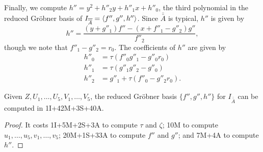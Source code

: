 \begin{comment}
\begin{align*}
  G_3 &= u_5 \\
  f''_2 &= u_5(u_5 - c_8) + u_4 - v_5 \\
  G_2 &= v_4 + v_5(u_5 - c_8) + \tau(u_5(u_5(u_3 - c_6) + v_5(u_4 - c_7) + c_5 - v_3) + v_5(u_3 - v_4) - u_2) \\
  e_3 &= f''_2v_5 - G_2u_5 \\
  f''_1 &= u_5(u_4 - c_7) + G_2 + u_3 - v_4 \\
  G_1 &= u_5(c_6 - u_3) - e_3 + v_3 \\
  f''_0 &= c_7e_3 + u_5(u_2 - c_4) + G_2u_3 + G_1u_4 - f''_2v_3 - f''_1v_4 + u_1 - v_2 \\
  G_0 &= -c_6e_3 + u_5(c_3 - u_1) - G_1u_3 + f''_1v_3 + v_1.
\end{align*}
\end{comment}

Finally, we compute $h'' = y^2 + h''_2y + h''_1x + h''_0$,
the third polynomial in the reduced Gr\"obner basis of $I_{\overline{\overline A}} = \left\langle f'', g'', h'' \right\rangle$.
Since $\bar{\bar A}$ is typical, $h''$ is given by
\[ h'' = \frac {(y + g''_1)f'' - (x + f''_1 - g''_2)g''} {f''_2}, \]
though we note that $f''_1 - g''_2 = r_0$.
The coefficients of $h''$ are given by
\begin{align*}
  h''_0 &= \tau(f''_0g''_1 - g''_0r_0) \\
  h''_1 &= \tau(g''_1g''_2 - g''_0) \\
  h''_2 &= g''_1 + \tau(f''_0 - g''_2r_0).
\end{align*}

\begin{lemma}
  \label{lem_fgh_op_count}
  Given $Z, U_1, \ldots, U_5, V_1, \ldots, V_5$,
  the reduced Gr\"obner basis $\{f'',g'',h''\}$ for $I_{\bar{\bar A}}$ can be computed in 1I+42M+3S+40A.
\end{lemma}
\begin{proof}
  It costs 1I+5M+2S+3A to compute $\tau$ and $\zeta$;
  10M to compute $u_1, \ldots, u_5, v_1, \ldots, v_5$;
  20M+1S+33A to compute $f''$ and $g''$; and
  7M+4A to compute $h''$.
\end{proof}



\pagebreak


